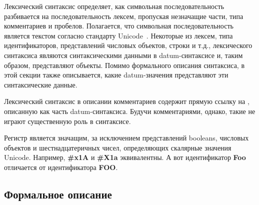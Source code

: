 Лексический синтаксис определяет, как символьная последовательность разбивается на
последовательность лексем, пропуская незначащие части, типа комментариев и
пробелов. Полагается, что символьная последовательность является текстом согласно стандарту
Unicode~\cite{Unicode}. Некоторые из лексем, типа идентификаторов, представлений числовых объектов,
строки и т.д., лексического синтаксиса являются синтаксическими данными в datum-синтаксисе
и, таким образом, представляют объекты. Помимо формального описания синтаксиса, в этой
секции также описывается, какие datum-значения представляют эти синтаксические
данные.

Лексический синтаксис в описании комментариев содержит прямую ссылку на ,
описанную как часть datum-синтаксиса. Будучи комментариями, однако,
такие  не играют существенную роль в синтаксисе.

Регистр является значащим, за исключением представлений booleans, числовых объектов и
шестнадцатеричных чисел, определяющих скалярные значения Unicode. Например, {\cf\bfseries \#x1A}
и {\cf\bfseries \#X1a} эквивалентны. А вот идентификатор {\cf\bfseries Foo} отличается от
идентификатора {\cf\bfseries FOO}.

\subsection{Формальное описание}
\label{lexicalgrammarsection}

